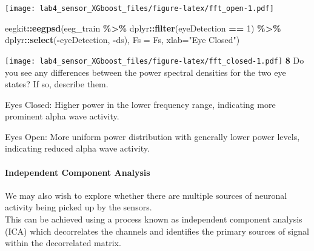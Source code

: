 \documentclass[
]{article}
\newenvironment{Shaded}{\begin{snugshade}}{\end{snugshade}}
\newcommand{\AttributeTok}[1]{\textcolor[rgb]{0.13,0.29,0.53}{#1}}
\newcommand{\DecValTok}[1]{\textcolor[rgb]{0.00,0.00,0.81}{#1}}
\newcommand{\FunctionTok}[1]{\textcolor[rgb]{0.13,0.29,0.53}{\textbf{#1}}}
\newcommand{\NormalTok}[1]{#1}
\newcommand{\SpecialCharTok}[1]{\textcolor[rgb]{0.81,0.36,0.00}{\textbf{#1}}}
\newcommand{\StringTok}[1]{\textcolor[rgb]{0.31,0.60,0.02}{#1}}
\begin{document}
\texttt{[image: lab4\_sensor\_XGboost\_files/figure-latex/fft\_open-1.pdf]}

\begin{Shaded}
\begin{Highlighting}[]
\NormalTok{eegkit}\SpecialCharTok{::}\FunctionTok{eegpsd}\NormalTok{(eeg\_train }\SpecialCharTok{\%\textgreater{}\%}\NormalTok{ dplyr}\SpecialCharTok{::}\FunctionTok{filter}\NormalTok{(eyeDetection }\SpecialCharTok{==} \DecValTok{1}\NormalTok{) }\SpecialCharTok{\%\textgreater{}\%}\NormalTok{ dplyr}\SpecialCharTok{::}\FunctionTok{select}\NormalTok{(}\SpecialCharTok{{-}}\NormalTok{eyeDetection, }\SpecialCharTok{{-}}\NormalTok{ds), }\AttributeTok{Fs =}\NormalTok{ Fs, }\AttributeTok{xlab=}\StringTok{"Eye Closed"}\NormalTok{)}
\end{Highlighting}
\end{Shaded}

\texttt{[image: lab4\_sensor\_XGboost\_files/figure-latex/fft\_closed-1.pdf]}
\textbf{8} Do you see any differences between the power spectral
densities for the two eye states? If so, describe them.

Eyes Closed: Higher power in the lower frequency range, indicating more
prominent alpha wave activity.

Eyes Open: More uniform power distribution with generally lower power
levels, indicating reduced alpha wave activity.

\paragraph{Independent Component
Analysis}\label{independent-component-analysis}

We may also wish to explore whether there are multiple sources of
neuronal activity being picked up by the sensors.\\
This can be achieved using a process known as independent component
analysis (ICA) which decorrelates the channels and identifies the
primary sources of signal within the decorrelated matrix.
\end{document}
